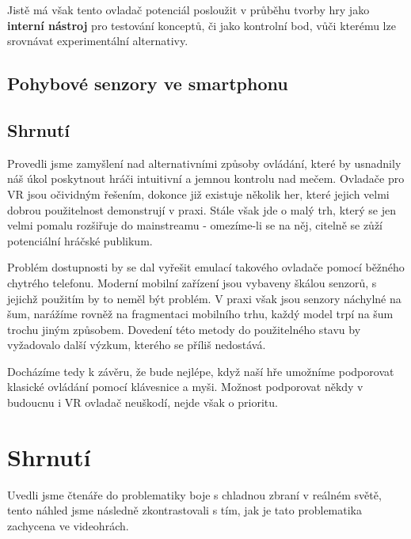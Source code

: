 Jistě má však tento ovladač potenciál posloužit v průběhu tvorby hry jako \textbf{interní nástroj} pro testování konceptů, či jako kontrolní bod, vůči kterému lze srovnávat experimentální alternativy.

\subsection{Pohybové senzory ve smartphonu}




\subsection{Shrnutí}
Provedli jsme zamyšlení nad alternativními způsoby ovládání, které by usnadnily náš úkol poskytnout hráči intuitivní a jemnou kontrolu nad mečem. Ovladače pro \acs{VR} jsou očividným řešením, dokonce již existuje několik her, které jejich velmi dobrou použitelnost demonstrují v praxi. Stále však jde o malý trh, který se jen velmi pomalu rozšiřuje do mainstreamu - omezíme-li se na něj, citelně se zůží potenciální hráčské publikum.

Problém dostupnosti by se dal vyřešit emulací takového ovladače pomocí běžného chytrého telefonu. Moderní mobilní zařízení jsou vybaveny škálou senzorů, s jejichž použitím by to neměl být problém. V praxi však jsou senzory náchylné na šum, narážíme rovněž na fragmentaci mobilního trhu, každý model trpí na šum trochu jiným způsobem. Dovedení této metody do použitelného stavu by vyžadovalo další výzkum, kterého se příliš nedostává.

Docházíme tedy k závěru, že bude nejlépe, když naší hře umožníme podporovat klasické ovládání pomocí klávesnice a myši. Možnost podporovat někdy v budoucnu i \acs{VR} ovladač neuškodí, nejde však o prioritu.

\section{Shrnutí}

Uvedli jsme čtenáře do problematiky boje s chladnou zbraní v reálném světě, tento náhled jsme následně zkontrastovali s tím, jak je tato problematika zachycena ve videohrách.


